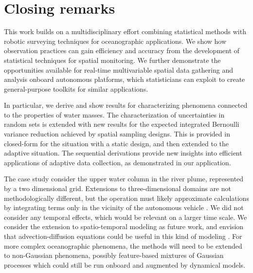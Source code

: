 \documentclass[aoas]{imsart}
\begin{document}
\section{Closing remarks}\label{sec:concl_disc}

This work builds on a multidisciplinary effort combining statistical
methods with robotic surveying techniques for oceanographic
applications. We show how observation practices can gain efficiency
and accuracy from the development of statistical techniques for spatial monitoring. We further demonstrate the
opportunities available for real-time multivariable spatial
data gathering and analysis onboard autonomous platforms, which
statisticians can exploit to create general-purpose toolkits for
similar applications.

In particular, we derive and show results for characterizing phenomena
connected to the properties of water masses. The characterization of
uncertainties in random sets is extended with new results for the expected integrated Bernoulli variance
reduction achieved by spatial sampling designs. This is
provided in closed-form for the situation with a static design, and
then extended to the adaptive situation. The sequential derivations
provide new insights into efficient applications of adaptive data collection,
as demonstrated in our application.

The case study consider the upper water column in the river plume, represented by a two dimensional grid. Extensions to three-dimensional domains are not methodologically different, but the operation must likely approximate calculations by integrating terms only in the vicinity of the autonomous vehicle \citep{fossum18b}. We did not consider any temporal effects, which would be
relevant on a larger time scale. We consider the extension to
spatio-temporal modeling as future work, and envision that
advection-diffusion equations could be useful in this kind of modeling
\citep{sigrist2015stochastic,richardson2017sparsity}. For more complex oceanographic
phenomena, the methods will need to be extended to non-Gaussian
phenomena, possibly feature-based mixtures of Gaussian processes which could still be
run onboard and augmented by dynamical models. 
\end{document}
